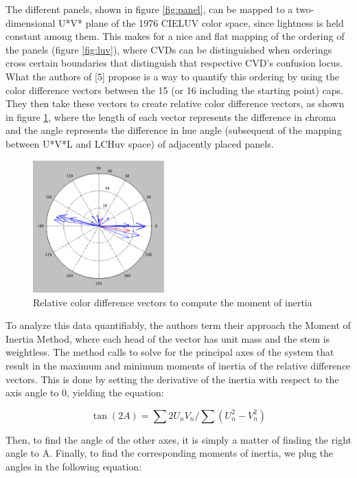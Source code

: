 \documentclass[10pt,twocolumn,letterpaper]{article}
\begin{document}
The different panels, shown in figure \ref{fig:panel}, can be mapped to a two-dimensional U*V* plane of the 1976 CIELUV color space, since lightness is held constant among them. This makes for a nice and flat mapping of the ordering of the panels (figure \ref{fig:luv}), where CVDs can be distinguished when orderings cross certain boundaries that distinguish that respective CVD’s confusion locus. What the authors of [5] propose is a way to quantify this ordering by using the color difference vectors between the 15 (or 16 including the starting point) caps.  They then take these vectors to create relative color difference vectors, as shown in figure \ref{fig:compass}, where the length of each vector represents the difference in chroma and the angle represents the difference in hue angle (subsequent of the mapping between U*V*L and LCHuv space) of adjacently placed panels.  

\begin{figure}[h]
  \centering
  \includegraphics[width=0.45\textwidth]{compass.png}
  \caption{Relative color difference vectors to compute the moment of inertia}
  \label{fig:compass}
\end{figure}

To analyze this data quantifiably, the authors term their approach the Moment of Inertia Method, where each head of the vector has unit mass and the stem is weightless. The method calls to solve for the principal axes of the system that result in the maximum and minimum moments of inertia of the relative difference vectors. This is done by setting the derivative of the inertia with respect to the axis angle to 0, yielding the equation: 

\begin{equation}\label{inertia1}
  \tan(2A) = \sum 2U_nV_n / \sum (U_n^{2} - V_n^{2})
\end{equation}

Then, to find the angle of the other axes, it is simply a matter of finding the right angle to A. 
Finally, to find the corresponding moments of inertia, we plug the angles in the following equation:
\end{document}
